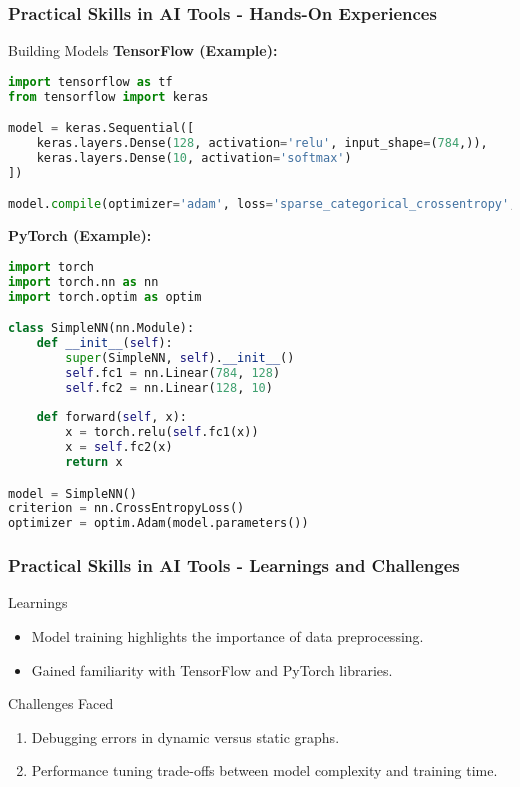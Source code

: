 \documentclass[aspectratio=169]{beamer}
\begin{document}
\begin{frame}[fragile]
    \frametitle{Practical Skills in AI Tools - Hands-On Experiences}
    \begin{block}{Building Models}
        \textbf{TensorFlow (Example):}
        \begin{lstlisting}[language=Python]
import tensorflow as tf
from tensorflow import keras

model = keras.Sequential([
    keras.layers.Dense(128, activation='relu', input_shape=(784,)),
    keras.layers.Dense(10, activation='softmax')
])

model.compile(optimizer='adam', loss='sparse_categorical_crossentropy', metrics=['accuracy'])
        \end{lstlisting}

        \textbf{PyTorch (Example):}
        \begin{lstlisting}[language=Python]
import torch
import torch.nn as nn
import torch.optim as optim

class SimpleNN(nn.Module):
    def __init__(self):
        super(SimpleNN, self).__init__()
        self.fc1 = nn.Linear(784, 128)
        self.fc2 = nn.Linear(128, 10)
        
    def forward(self, x):
        x = torch.relu(self.fc1(x))
        x = self.fc2(x)
        return x

model = SimpleNN()
criterion = nn.CrossEntropyLoss()
optimizer = optim.Adam(model.parameters())
        \end{lstlisting}
    \end{block} 
\end{frame}

\begin{frame}[fragile]
    \frametitle{Practical Skills in AI Tools - Learnings and Challenges}
    \begin{block}{Learnings}
        \begin{itemize}
            \item Model training highlights the importance of data preprocessing.
            \item Gained familiarity with TensorFlow and PyTorch libraries.
        \end{itemize}
    \end{block}
    
    \begin{block}{Challenges Faced}
        \begin{enumerate}
            \item Debugging errors in dynamic versus static graphs.
            \item Performance tuning trade-offs between model complexity and training time.
        \end{enumerate}
    \end{block}
\end{frame}
\end{document}
